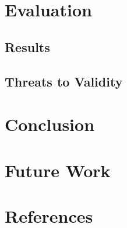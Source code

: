 \documentclass[a4paper]{scrartcl}
\begin{document}
\section{Evaluation}
\subsection{Results}
\subsection{Threats to Validity}
\section{Conclusion}
\section{Future Work}

\newpage
\section*{References}
\renewcommand\refname{}


\end{document}
